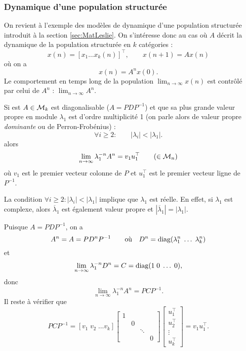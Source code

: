 \subsubsection{Dynamique d'une population structurée}

On revient à l'exemple des modèles de dynamique d'une population structurée introduit à la section \ref{sec:MatLeslie}. On s'intéresse donc au cas où $A$ décrit la dynamique de la population structurée en $k$ catégories : 
$$
x(n) = [x_1 \dots x_k(n)]^\top, \qquad x(n+1) = A x(n)
$$
où on a
$$
x(n) = A^n x(0).
$$
Le comportement en temps long de la population $\lim_{n \to\infty} x(n)$ est contrôlé par celui de $A^n$ : $\lim_{n \to\infty} A^n$.

\begin{proposition}
  Si est $A \in \mathcal{M}_k$ est diagonalisable ($A = P D P^{-1}$) et que sa plus grande valeur propre en module $\lambda_1$ est d'ordre multiplicité 1 (on parle alors de valeur propre {\em dominante} ou de Perron-Frobénius) :
  $$
  \forall i \geq 2: \qquad |\lambda_i| < |\lambda_1|.
  $$
  alors
  $$
  \lim_{n \to \infty} \lambda_1^{-n} A^n = v_1 u_1^\top \qquad (\in \mathcal{M}_n)
  $$
  où $v_1$ est le premier vecteur colonne de $P$ et $u_1^\top$ est le premier vecteur ligne de $P^{-1}$.
\end{proposition}

\remark
La condition $\forall i \geq 2: |\lambda_i| < |\lambda_1|$ implique que $\lambda_1$ est réelle. En effet, si $\lambda_1$ est complexe, alors $\overline{\lambda}_1$ est également valeur propre et $|\overline{\lambda}_1| = |\lambda_1|$.

\proof
  Puisque $A = P D P^{-1}$, on a
  $$
  A^n = A = P D^n P^{-1}
  \qquad \text{où} \quad 
  D^n = \operatorname{diag}(\lambda_1^n \; \dots \; \lambda_k^n)
  $$
  et 
  $$
  \lim_{n \to \infty} \lambda_1^{-n} D^n = C = \operatorname{diag}(1 \; 0 \; \dots \; 0),
  $$
  donc
  $$
  \lim_{n \to \infty} \lambda_1^{-n} A^n = P C P^{-1}.
  $$
  Il reste à vérifier que
  $$
  P C P^{-1} 
  = \left[v_1 \; v_2 \; \dots v_k\right] 
  \left[\begin{array}{cccc} 1 & & & \\ & 0 & & \\ & & \ddots & \\ & & & 0 \end{array} \right] 
  \left[\begin{array}{c} u_1^\top \\ u_2^\top \\ \vdots \\ u_k^\top \end{array}\right] 
  = v_1 u_1^\top .
  $$
\eproof

